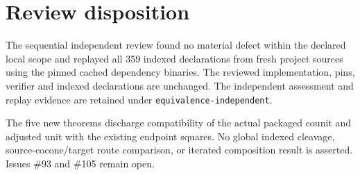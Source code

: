 \documentclass{article}
\begin{document}
\section*{Review disposition}
The sequential independent review found no material defect within the declared local scope and replayed all 359 indexed declarations from fresh project sources using the pinned cached dependency binaries. The reviewed implementation, pins, verifier and indexed declarations are unchanged. The independent assessment and replay evidence are retained under \texttt{equivalence-independent}.

The five new theorems discharge compatibility of the actual packaged counit and adjusted unit with the existing endpoint squares. No global indexed cleavage, source-cocone/target route comparison, or iterated composition result is asserted. Issues \#93 and \#105 remain open.
\end{document}
